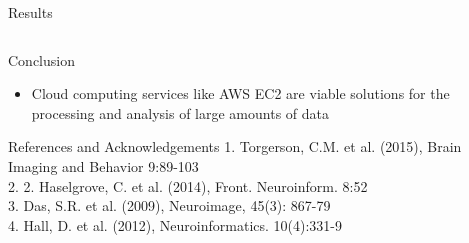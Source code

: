 \documentclass[final,hyperref={pdfpagelabels=false}]{beamer}
\begin{document}
\begin{frame}
\begin{columns}
\begin{column}{.5\textwidth}
{\begin{block}{Results}
\begin{column}{.47\textwidth}
          \end{column}
        \end{block}
        \begin{block}{Conclusion}
            \begin{itemize}
                \item Cloud computing services like AWS EC2 are viable solutions for the processing and analysis of large amounts of data
            \end{itemize}
        \end{block}
        \begin{block}{References and Acknowledgements}
            1. Torgerson, C.M. et al. (2015), Brain Imaging and Behavior 9:89-103\\
			2. 
            2. Haselgrove, C. et al. (2014), Front. Neuroinform. 8:52\\
            3. Das, S.R. et al. (2009), Neuroimage, 45(3): 867-79\\
            4. Hall, D. et al. (2012), Neuroinformatics. 10(4):331-9\\

\end{block}}
\end{column}
\end{columns}
\end{frame}
\end{document}
